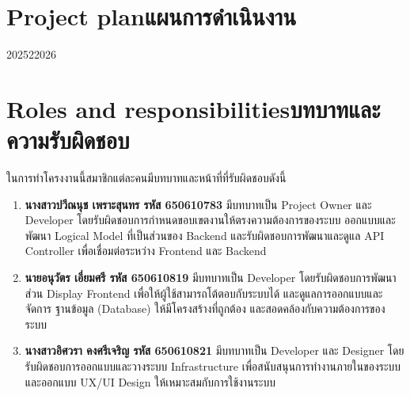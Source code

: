 \section{\ifenglish Project plan\else แผนการดำเนินงาน\fi}

\begin{plan}{6}{2025}{2}{2026}
\end{plan}

\section{\ifenglish Roles and responsibilities\else บทบาทและความรับผิดชอบ\fi}
\begin{mypara}
    \indent ในการทำโครงงานนี้สมาชิกแต่ละคนมีบทบาทและหน้าที่ที่รับผิดชอบดังนี้
\end{mypara}
\begin{enumerate}
    \item \textbf{นางสาวปวีณนุช เพราะสุนทร รหัส 650610783} มีบทบาทเป็น Project Owner และ Developer 
    โดยรับผิดชอบการกำหนดขอบเขตงานให้ตรงความต้องการของระบบ ออกแบบและพัฒนา Logical Model ที่เป็นส่วนของ Backend 
    และรับผิดชอบการพัฒนาและดูแล API Controller เพื่อเชื่อมต่อระหว่าง Frontend และ Backend
    \item \textbf{นายอนุวัตร เอี่ยมศรี รหัส 650610819} มีบทบาทเป็น Developer โดยรับผิดชอบการพัฒนาส่วน Display Frontend เพื่อให้ผู้ใช้สามารถโต้ตอบกับระบบได้ และดูแลการออกแบบและจัดการ 
    ฐานข้อมูล (Database) ให้มีโครงสร้างที่ถูกต้อง และสอดคล้องกับความต้องการของระบบ
    \item \textbf{นางสาวอิศวรา คงศรีเจริญ รหัส 650610821} มีบทบาทเป็น Developer และ Designer โดยรับผิดชอบการออกแบบและวางระบบ Infrastructure เพื่อสนับสนุนการทำงานภายในของระบบ 
    และออกแบบ UX/UI Design ให้เหมาะสมกับการใช้งานระบบ
\end{enumerate}

